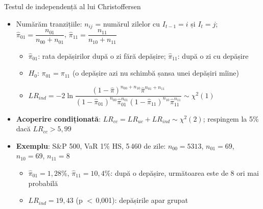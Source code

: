 \begin{frame}{Testul de independență al lui Christoffersen}
\itemsize{\footnotesize}
\begin{itemize}
    \item Numărăm tranzițiile: $n_{ij}$ = numărul zilelor cu $I_{t-1} = i$ și $I_t = j$; $\hat\pi_{01} = \dfrac{n_{01}}{n_{00} + n_{01}}$, $\hat\pi_{11} = \dfrac{n_{11}}{n_{10} + n_{11}}$
    \begin{itemize}
        \item $\hat\pi_{01}$: rata depășirilor după o zi fără depășire; $\hat\pi_{11}$: după o zi cu depășire
        \item $H_0$: $\pi_{01} = \pi_{11}$ (o depășire azi nu schimbă șansa unei depășiri mîine) 
        \item $LR_{ind} = -2\ln\dfrac{(1 - \hat\pi)^{n_{00} + n_{10}}\hat\pi^{n_{01} + n_{11}}}{(1 - \hat\pi_{01})^{n_{00}}\hat\pi_{01}^{n_{01}}(1 - \hat\pi_{11})^{n_{10}}\hat\pi_{11}^{n_{11}}} \sim \chi^2(1)$
    \end{itemize}
    \item \textbf{Acoperire condiționată}: $LR_{cc} = LR_{uc} + LR_{ind} \sim \chi^2(2)$; respingem la 5\% dacă $LR_{cc} > 5{,}99$
    \item \textbf{Exemplu}: S\&P 500, VaR 1\% HS, 5\,460 de zile: $n_{00} = 5313$, $n_{01} = 69$, $n_{10} = 69$, $n_{11} = 8$
    \begin{itemize}
        \item $\hat\pi_{01} = 1{,}28\%$, $\hat\pi_{11} = 10{,}4\%$: după o depășire, următoarea este de 8 ori mai probabilă
        \item $LR_{ind} = 19{,}43$ (p $<$\,0{,}001): depășirile apar grupat
    \end{itemize}
\end{itemize}
\end{frame}

